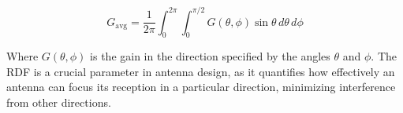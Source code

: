 \[
G_{\text{avg}} = \frac{1}{2\pi} \int_{0}^{2\pi} \int_{0}^{\pi/2} G(\theta, \phi) \sin\theta \, d\theta \, d\phi
\]

Where \( G(\theta, \phi) \) is the gain in the direction specified by the angles \( \theta \) and \( \phi \). The RDF is a crucial parameter in antenna design, as it quantifies how effectively an antenna can focus its reception in a particular direction, minimizing interference from other directions.

